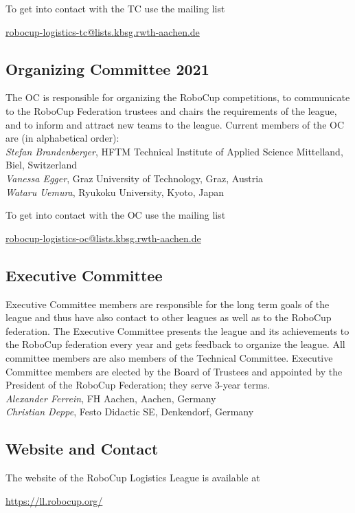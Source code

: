 \documentclass[12pt,twoside]{article}
\begin{document}
\medskip
\noindent To get into contact with the \ac{TC} use the mailing list\\
\centerline{\url{robocup-logistics-tc@lists.kbsg.rwth-aachen.de}}

\subsection{Organizing Committee 2021}
\label{sec:oc}
The \ac{OC} is responsible for organizing the
RoboCup competitions, to communicate to the RoboCup Federation
trustees and chairs the requirements of the league, and to inform and
attract new teams to the league. Current members of the \ac{OC} are (in
alphabetical order):\\[.5em]
\emph{Stefan Brandenberger}, HFTM Technical Institute of Applied Science
Mittelland, Biel, Switzerland\\
\emph{Vanessa Egger}, Graz University of Technology, Graz, Austria\\
\emph{Wataru Uemura}, Ryukoku University, Kyoto, Japan

\medskip
\noindent To get into contact with the \ac{OC} use the mailing list\\
\centerline{\url{robocup-logistics-oc@lists.kbsg.rwth-aachen.de}}

\subsection{Executive Committee}
\label{sec:ec}
Executive Committee members are responsible for the long term goals of
the league and thus have also contact to other leagues as well as to
the RoboCup federation. The Executive Committee presents the league
and its achievements to the RoboCup federation every year and gets
feedback to organize the league. All committee members are also
members of the Technical Committee. Executive Committee members are
elected by the Board of Trustees and appointed by the President of the
RoboCup Federation; they serve 3-year terms.\\[.5em]
\emph{Alexander Ferrein}, FH Aachen, Aachen, Germany\\
\emph{Christian Deppe}, Festo Didactic SE, Denkendorf, Germany

\subsection{Website and Contact}
\label{sec:website-ml}
The website of the RoboCup Logistics League is available at\\
\centerline{\url{https://ll.robocup.org/}}
\end{document}
